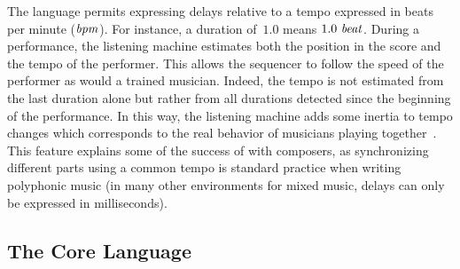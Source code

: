 \documentclass[preprint]{sigplanconf}
\begin{document}
The language permits expressing delays relative to a tempo expressed
in beats per minute (${{\mbox{\emph{bpm}}}}$). For instance, a duration of~$1.0$
means ${1.0\ {{\mbox{\emph{beat}}}}}$. During a performance, the listening machine
estimates both the position in the score and the tempo of the
performer. This allows the sequencer to follow the speed of the
performer as would a trained musician. Indeed, the tempo is not
estimated from the last duration alone but rather from all durations
detected since the beginning of the performance. In this way, the
listening machine adds some inertia to tempo changes which corresponds
to the real behavior of musicians playing
together~\cite{cont2008antescofo}.  This feature explains some of the
success of \Antescofo with composers, as synchronizing different parts
using a common tempo is standard practice when writing polyphonic
music (in many other environments for mixed music, delays can only be
expressed in milliseconds).




\subsection{The Core Language}
\label{sec:language}
\end{document}
